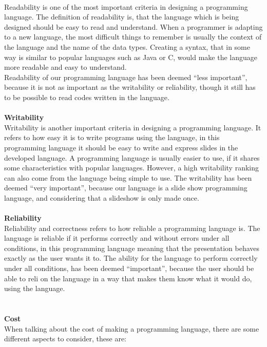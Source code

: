  \\
Readability is one of the most important criteria in designing a programming language. The definition of readability is, that the language which is being designed should be easy to read and understand. When a programmer is adapting to a new language, the most difficult things to remember is usually the context of the language and the name of the data types. Creating a syntax, that in some way is similar to popular languages such as Java or C, would make the language more readable and easy to understand. \\
Readability of our programming language has been deemed ``less important'', because it is not as important as the writability or reliability, though it still has to be possible to read codes written in the language.
\\ \\
\textbf{Writability} \\
Writability is another important criteria in designing a programming language. It refers to how easy it is to write programs using the language, in this programming language it should be easy to write and express slides in the developed language. A programming language is usually easier to use, if it shares some characteristics with popular languages. However, a high writability ranking can also come from the language being simple to use. The writability has been deemed ``very important'', because our language is a slide show programming language, and considering that a slideshow is only made once.
\\ \\
\textbf{Reliability} \\
Reliability and correctness refers to how reliable a programming language is. The language is reliable if it performs correctly and without errors under all conditions, in this programming language meaning that the presentation behaves exactly as the user wants it to. The ability for the language to perform correctly under all conditions, has been deemed ``important'', because the user should be able to reli on the language in a way that makes them know what it would do, using the language.\\
\\ \\
\textbf{Cost} \\
When talking about the cost of making a programming language, there are some different aspects to consider, these are:
